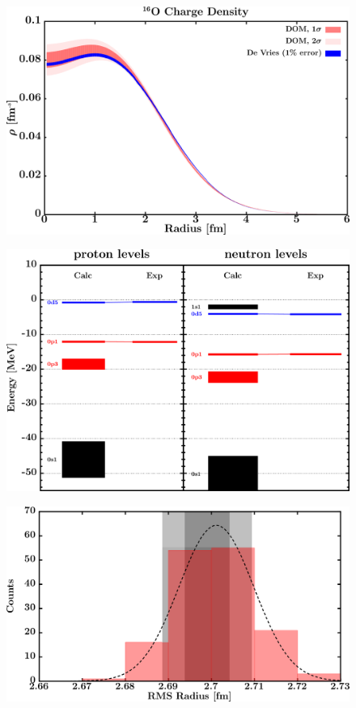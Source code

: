 \documentclass[twocolumn,secnumarabic,amssymb, nobibnotes, aps, prl,
superscriptaddress, nobalancelastpage]{revtex4}
\begin{document}
\begin{figure}
    \centering
    \begin{minipage}{0.45\textwidth}
        \centering
        \includegraphics[width=\textwidth]{figures/o16_chargeDensity.png}
        \label{DOM_o16_chargeDensity}
    \end{minipage}
    \begin{minipage}{0.45\textwidth}
        \centering
        \includegraphics[width=\textwidth]{figures/o16_SPLevels.png}
        \label{DOM_o16_SPLevels}
    \end{minipage}
    \begin{minipage}{0.45\textwidth}
        \centering
        \includegraphics[width=\textwidth]{figures/o16_RMSRadius.png}

\end{minipage}
\end{figure}
\end{document}
